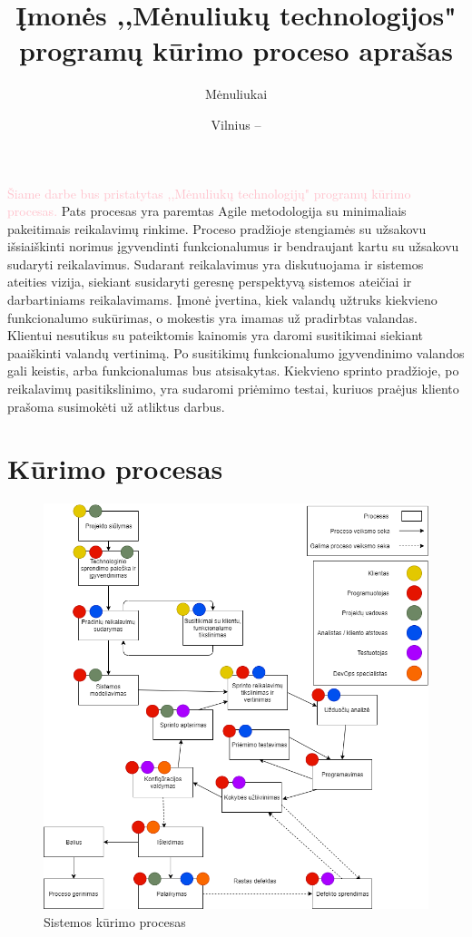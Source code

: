 \documentclass{VUMIFPSkursinis}
\title{Įmonės ,,Mėnuliukų technologijos" programų kūrimo proceso aprašas}
\author{Mėnuliukai}
\date{Vilnius – \the\year}
\begin{document}
\maketitle

\tableofcontents

	\textcolor{pink}{Šiame darbe bus pristatytas ,,Mėnuliukų technologijų" programų kūrimo procesas.}
	Pats procesas yra paremtas Agile metodologija su minimaliais pakeitimais reikalavimų rinkime.
	Proceso pradžioje stengiamės su užsakovu išsiaiškinti norimus įgyvendinti funkcionalumus ir bendraujant kartu su užsakovu sudaryti reikalavimus.
	Sudarant reikalavimus yra diskutuojama ir sistemos ateities vizija, siekiant susidaryti geresnę perspektyvą sistemos ateičiai ir darbartiniams reikalavimams.
	Įmonė įvertina, kiek valandų užtruks kiekvieno funkcionalumo sukūrimas, o mokestis yra imamas už pradirbtas valandas.
	Klientui nesutikus su pateiktomis kainomis yra daromi susitikimai siekiant paaiškinti valandų vertinimą. Po susitikimų funkcionalumo įgyvendinimo valandos gali keistis, arba funkcionalumas bus atsisakytas.
	Kiekvieno sprinto pradžioje, po reikalavimų pasitikslinimo, yra sudaromi priėmimo testai, kuriuos praėjus kliento prašoma susimokėti už atliktus darbus.

\section{Kūrimo procesas}
	\begin{figure}[htbp]
		\includegraphics[scale=0.6]{img/SoftwareProcessMoonTechnologies}
		\caption{Sistemos kūrimo procesas} %
		\label{img:kurimoProcesas}
	\end{figure}
\end{document}
